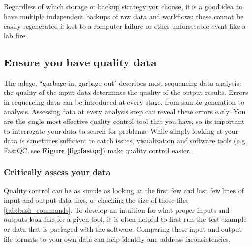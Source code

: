 \documentclass[10pt,letterpaper]{article}
\begin{document}
Regardless of which storage or backup strategy you choose, it is a good idea to have multiple independent backups of raw data and workflows; these cannot be easily regenerated if lost to a computer failure or other unforseeable event like a lab fire. 

\subsection*{Ensure you have quality data} %

 
The adage, ``garbage in, garbage out" describes most sequencing data analysis: the quality of the input data determines the quality of the output results. 
Errors in sequencing data can be introduced at every stage, from sample generation to analysis. 
Assessing data at every analysis step can reveal these errors early. 
You are the single most effective quality control tool that you have, so its important to interrogate your data to search for problems. 
While simply looking at your data is sometimes sufficient to catch issues, visualization and software tools (e.g. FastQC, see \textbf{Figure \ref{fig:fastqc}}) make quality control easier. 



\subsubsection*{Critically assess your data}
Quality control can be as simple as looking at the first few and last few lines of input and output data files, or checking the size of those files {\ref{tab:bash_commands}}. 
To develop an intuition for what proper inputs and outputs look like for a given tool, it is often helpful to first run the test example or data that is packaged with the software. 
Comparing these input and output file formats to your own data can help identify and address inconsistencies. 
\end{document}
